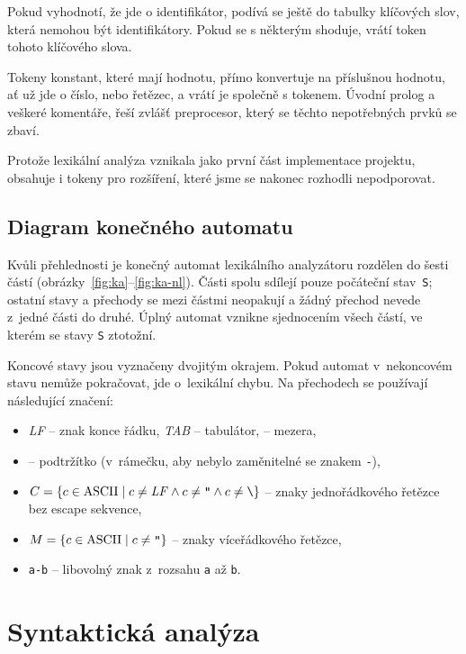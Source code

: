 \documentclass[a4paper,11pt]{article}
\newcommand{\kaLF}{{\normalfont\textit{LF}}}
\newcommand{\kaTAB}{{\normalfont\textit{TAB}}}
\newcommand{\kaSP}{\textvisiblespace}
\newcommand{\kaQ}{\textquotedbl}
\newcommand{\kaBS}{\textbackslash}
\newcommand{\kaUS}{{\setlength{\fboxsep}{0.6pt}\setlength{\fboxrule}{0.3pt}\fbox{\vphantom{Ag}\_}}}
\begin{document}
Pokud vyhodnotí, že jde o identifikátor, podívá se ještě do tabulky klíčových slov, která nemohou být identifikátory. Pokud se s některým shoduje, vrátí token tohoto klíčového slova.

Tokeny konstant, které mají hodnotu, přímo konvertuje na příslušnou hodnotu, ať už jde o číslo, nebo řetězec, a vrátí je společně s tokenem. Úvodní prolog a veškeré komentáře, řeší zvlášť preprocesor, který se těchto nepotřebných prvků se zbaví.

Protože lexikální analýza vznikala jako první část implementace projektu, obsahuje i tokeny pro rozšíření, které jsme se nakonec rozhodli nepodporovat.

\subsection{Diagram konečného automatu}
Kvůli přehlednosti je konečný automat lexikálního analyzátoru rozdělen do
šesti částí (obrázky~\ref{fig:ka}--\ref{fig:ka-nl}). Části spolu sdílejí
pouze počáteční stav~\texttt{S}; ostatní stavy a přechody se mezi částmi
neopakují a žádný přechod nevede z~jedné části do druhé. Úplný automat
vznikne sjednocením všech částí, ve kterém se stavy \texttt{S} ztotožní.

Koncové stavy jsou vyznačeny dvojitým okrajem. Pokud automat v~nekoncovém
stavu nemůže pokračovat, jde o~lexikální chybu. Na přechodech se používají
následující značení:
\begin{itemize}
  \item \kaLF{} -- znak konce řádku, \kaTAB{} -- tabulátor, \kaSP{} -- mezera,
  \item \texttt{\kaUS} -- podtržítko (v~rámečku, aby nebylo zaměnitelné se znakem \texttt{-}),
  \item $C = \{c \in \mathrm{ASCII} \mid c \neq \mbox{\kaLF} \wedge c \neq \texttt{\kaQ} \wedge c \neq \texttt{\kaBS}\}$
        -- znaky jednořádkového řetězce bez escape sekvence,
  \item $M = \{c \in \mathrm{ASCII} \mid c \neq \texttt{\kaQ}\}$
        -- znaky víceřádkového řetězce,
  \item \texttt{a-b} -- libovolný znak z~rozsahu \texttt{a} až \texttt{b}.
\end{itemize}



\section{Syntaktická analýza}
\end{document}
